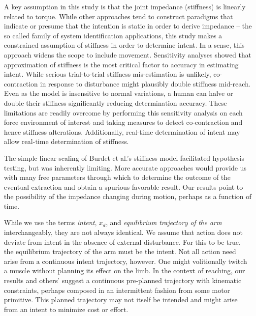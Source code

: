 A key assumption in this study is that the joint impedance (stiffness) is linearly related to torque. While other approaches tend to construct paradigms that indicate or presume that the intention is static in order to derive impedance -- the so called family of system identification applications, this study makes a constrained assumption of stiffness in order to determine intent. In a sense, this approach widens the scope to include movement. Sensitivity analyses showed that approximation of stiffness is the most critical factor to accuracy in estimating intent. While serious trial-to-trial stiffness mis-estimation is unlikely, co-contraction in response to disturbance might plausibly double stiffness mid-reach. Even as the model is insensitive to normal variations, a human can halve or double their stiffness \cite{franklin2007endpoint} significantly reducing determination accuracy. These limitations are readily overcome by performing this sensitivity analysis on each force environment of interest and taking measures to detect co-contraction and hence stiffness alterations. Additionally, real-time determination of intent may allow real-time determination of stiffness.

The simple linear scaling of Burdet et al.'s stiffness model \cite{burdet2006stability} facilitated hypothesis testing, but was inherently limiting. More accurate approaches would provide us with many free parameters through which to determine the outcome of the eventual extraction and obtain a spurious favorable result. Our results point to the possibility of the impedance changing during motion, perhaps as a function of time. 

While we use the terms \textit{intent}, $x_d$, and \textit{equilibrium trajectory of the arm} interchangeably, they are not always identical. We assume that action does not deviate from intent in the absence of external disturbance. For this to be true, the equilibrium trajectory of the arm must be the intent. Not all action need arise from a continuous intent trajectory, however. One might volitionally twitch a muscle without planning its effect on the limb. In the context of reaching, our results and others' \cite{flash1991arm, bizzi1984posture, shadmehr1994adaptive, rohrer2004submovements, fortney2012computational, mistry2013optimal} suggest a continuous pre-planned trajectory with kinematic constraints, perhaps composed in an intermittent fashion from some motor primitive. This planned trajectory may not itself be intended and might arise from an intent to minimize cost or effort. 

